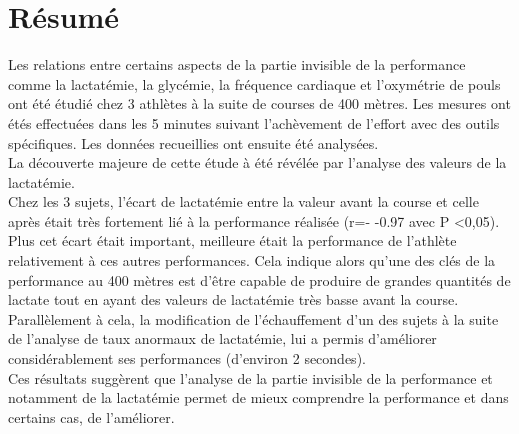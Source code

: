 \chapter*{Résumé}
\label{chap:resume}



Les relations entre certains aspects de la partie invisible de la performance comme la lactatémie, la glycémie, la fréquence cardiaque et l'oxymétrie de pouls ont été étudié chez 3 athlètes à la suite de courses de 400 mètres. Les mesures ont étés effectuées dans les 5 minutes suivant l'achèvement de l'effort avec des outils spécifiques. Les données recueillies ont ensuite été analysées. \\

La découverte majeure de cette étude à été révélée par l'analyse des valeurs de la lactatémie. \\

Chez les 3 sujets, l'écart de lactatémie entre la valeur avant la course et celle après était très fortement lié à la performance réalisée (r=-
-0.97 avec P <0,05). Plus cet écart était important, meilleure était la performance de l'athlète relativement à ces autres performances. Cela indique alors qu'une des clés de la performance au 400 mètres est d'être capable de produire de grandes quantités de lactate tout en ayant des valeurs de lactatémie très basse avant la course.\\

Parallèlement à cela, la modification de l'échauffement d'un des sujets à la suite de l'analyse de taux anormaux de lactatémie, lui a permis d'améliorer considérablement ses performances (d'environ 2 secondes).\\

Ces résultats suggèrent que l'analyse de la partie invisible de la performance et notamment de la lactatémie permet de mieux comprendre la performance et dans certains cas, de l'améliorer.

        
